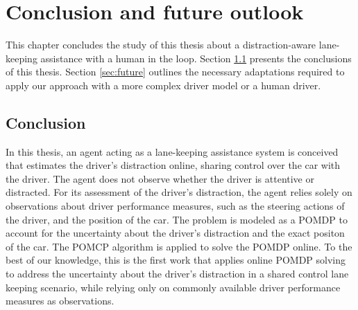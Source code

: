\chapter{Conclusion and future outlook}
\label{ch:conclusion}

This chapter concludes the study of this thesis about a distraction-aware lane-keeping assistance with a human in the loop. Section \ref{sec:conclusion} presents the conclusions of this thesis. Section \ref{sec:future} outlines the necessary adaptations required to apply our approach with a more complex driver model or a human driver.

\section{Conclusion}
\label{sec:conclusion}



In this thesis, an agent acting as a lane-keeping assistance system is conceived that estimates the driver's distraction online, sharing control over the car with the driver. The agent does not observe whether the driver is attentive or distracted. For its assessment of the driver's distraction, the agent relies solely on observations about driver performance measures, such as the steering actions of the driver, and the position of the car. The problem is modeled as a POMDP to account for the uncertainty about the driver's distraction and the exact positon of the car. The POMCP algorithm is applied to solve the POMDP online. To the best of our knowledge, this is the first work that applies online POMDP solving to address the uncertainty about the driver's distraction in a shared control lane keeping scenario, while relying only on commonly available driver performance measures as observations.

